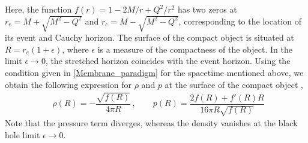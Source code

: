 \documentclass[aps,prd,twocolumn,floatfix,noshowpacs,tightenlines,noshowkeys,superscriptaddress,amsmath,amssymb,
nofootinbib]{revtex4-1}
\renewcommand\[{\begin{equation}}
\renewcommand\]{\end{equation}}
\begin{document}
Here, the function $f(r)=1-2M/r+Q^{2}/r^{2}$ has two zeros at $r_e=M+\sqrt{M^2-Q^2}$ and $r_c=M-\sqrt{M^2-Q^2}$, corresponding to the location of its event and Cauchy horizon. The surface of the compact object is situated at $R=r_e(1+\epsilon)$, where $\epsilon$ is a measure of the compactness of the object. In the limit $\epsilon \to 0$, the stretched horizon coincides with the event horizon. Using the condition given in \autoref{Membrane_paradigm} for the spacetime mentioned above, we obtain the following expression for $\rho$ and $p$ at the surface of the compact object \cite{Maggio:2020jml},
\begin{eqnarray}\label{rho_p}
&{\rho}(R)=-\dfrac{\sqrt{f(R)}}{4\pi R}\,,\qquad{p}(R)=\dfrac{2f(R)+f'(R)R}{16\pi R\sqrt{f(R)}}~
\end{eqnarray}
Note that the pressure term diverges, whereas the density vanishes at the black hole limit $\epsilon\to 0$.
\end{document}

